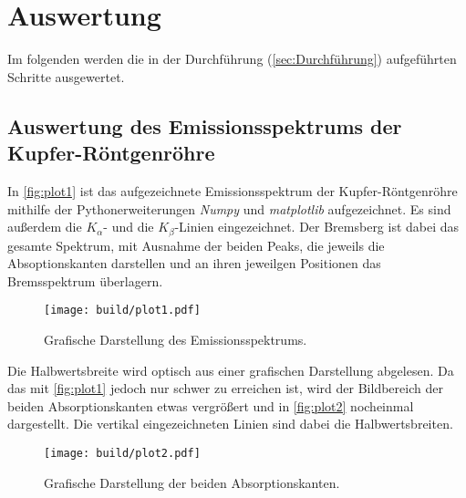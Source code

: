 \section{Auswertung}
\label{sec:Auswertung}

Im folgenden werden die in der Durchführung (\autoref{sec:Durchführung}) aufgeführten Schritte ausgewertet.

\subsection{Auswertung des Emissionsspektrums der Kupfer-Röntgenröhre}
\label{subsec:emissionsspektrum}
In \autoref{fig:plot1} ist das aufgezeichnete Emissionsspektrum der Kupfer-Röntgenröhre mithilfe der Pythonerweiterungen \textit{Numpy} \cite{numpy} und \textit{matplotlib} \cite{matplotlib} aufgezeichnet. Es sind außerdem die $K_\alpha$- und die $K_\beta$-Linien
eingezeichnet. Der Bremsberg ist dabei das gesamte Spektrum, mit Ausnahme der beiden Peaks, die jeweils die Absoptionskanten darstellen und an ihren jeweilgen Positionen das Bremsspektrum überlagern. 

\begin{figure}[H]
  \centering
  \texttt{[image: build/plot1.pdf]}
  \caption{Grafische Darstellung des Emissionsspektrums.}
  \label{fig:plot1}
\end{figure}

Die Halbwertsbreite wird optisch aus einer grafischen Darstellung abgelesen. Da das mit \autoref{fig:plot1} jedoch nur schwer zu erreichen ist, wird der Bildbereich
der beiden Absorptionskanten etwas vergrößert und in \autoref{fig:plot2} nocheinmal dargestellt. Die vertikal eingezeichneten Linien sind dabei die Halbwertsbreiten.

\begin{figure}[H]
  \centering
  \texttt{[image: build/plot2.pdf]}
  \caption{Grafische Darstellung der beiden Absorptionskanten.}
  \label{fig:plot2}
\end{figure}

